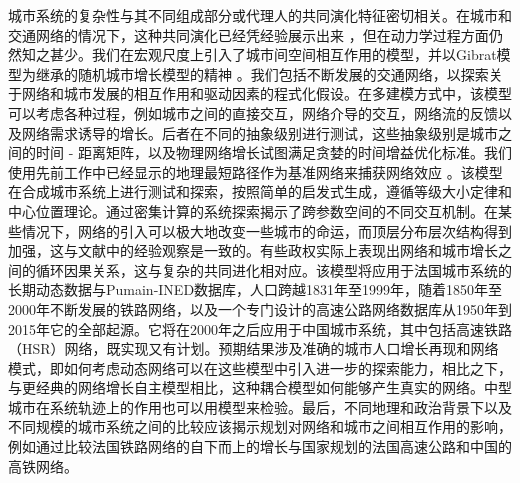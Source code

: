 


城市系统的复杂性与其不同组成部分或代理人的共同演化特征密切相关\cite{pumain1997pour}。在城市和交通网络的情况下，这种共同演化已经凭经验展示出来 \cite{bretagnolle2009villes}，但在动力学过程方面仍然知之甚少。我们在宏观尺度上引入了城市间空间相互作用的模型，并以Gibrat模型为继承的随机城市增长模型的精神 \cite{favaro2011gibrat}。我们包括不断发展的交通网络，以探索关于网络和城市发展的相互作用和驱动因素的程式化假设。在多建模方式中，该模型可以考虑各种过程，例如城市之间的直接交互，网络介导的交互，网络流的反馈以及网络需求诱导的增长。后者在不同的抽象级别进行测试，这些抽象级别是城市之间的时间 - 距离矩阵，以及物理网络增长试图满足贪婪的时间增益优化标准。我们使用先前工作中已经显示的地理最短路径作为基准网络来捕获网络效应 \cite{raimbault:halshs-01370274}。该模型在合成城市系统上进行测试和探索，按照简单的启发式生成，遵循等级大小定律和中心位置理论。通过密集计算的系统探索揭示了跨参数空间的不同交互机制。在某些情况下，网络的引入可以极大地改变一些城市的命运，而顶层分布层次结构得到加强，这与文献中的经验观察是一致的。有些政权实际上表现出网络和城市增长之间的循环因果关系，这与复杂的共同进化相对应。该模型将应用于法国城市系统的长期动态数据与Pumain-INED数据库，人口跨越1831年至1999年，随着1850年至2000年不断发展的铁路网络，以及一个专门设计的高速公路网络数据库从1950年到2015年它的全部起源。它将在2000年之后应用于中国城市系统，其中包括高速铁路（HSR）网络，既实现又有计划。预期结果涉及准确的城市人口增长再现和网络模式，即如何考虑动态网络可以在这些模型中引入进一步的探索能力，相比之下，与更经典的网络增长自主模型相比，这种耦合模型如何能够产生真实的网络。中型城市在系统轨迹上的作用也可以用模型来检验。最后，不同地理和政治背景下以及不同规模的城市系统之间的比较应该揭示规划对网络和城市之间相互作用的影响，例如通过比较法国铁路网络的自下而上的增长与国家规划的法国高速公路和中国的高铁网络。









\bigskip
\bigskip











